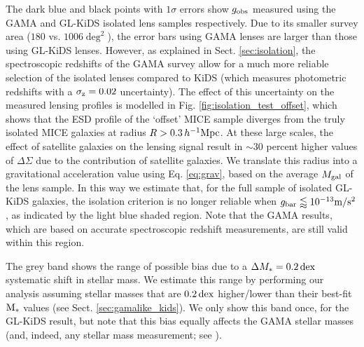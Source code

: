 \documentclass[usenatbib]{mnras}
\newcommand{\hMpc}{\, h^{-1}{\rm{Mpc}} }
\newcommand{\mpss}{ {\rm m/s^2} }
\newcommand{\un}[1]{_{\rm #1}}
\newcommand{\dex}{\, {\rm dex}}
\begin{document}
The dark blue and black points with $1\sigma$ errors show $g\un{obs}$ measured using the GAMA and GL-KiDS isolated lens samples respectively. Due to its smaller survey area ($180$ vs. $1006 \deg^2$), the error bars using GAMA lenses are larger than those using GL-KiDS lenses. However, as explained in Sect. \ref{sec:isolation}, the spectroscopic redshifts of the GAMA survey allow for a much more reliable selection of the isolated lenses compared to KiDS (which measures photometric redshifts with a $\sigma\un{z}=0.02$ uncertainty). The effect of this uncertainty on the measured lensing profiles is modelled in Fig. \ref{fig:isolation_test_offset}, which shows that the ESD profile of the `offset' MICE sample diverges from the truly isolated MICE galaxies at radius $R > 0.3 \hMpc$. At these large scales, the effect of satellite galaxies on the lensing signal result in $\sim30$ percent higher values of $\Delta\Sigma$ due to the contribution of satellite galaxies. We translate this radius into a gravitational acceleration value using Eq. \ref{eq:grav}, based on the average $M\un{gal}$ of the lens sample. In this way we estimate that, for the full sample of isolated GL-KiDS galaxies, the isolation criterion is no longer reliable when $g\un{bar} \lessapprox 10^{-13} \mpss$, as indicated by the light blue shaded region. Note that the GAMA results, which are based on accurate spectroscopic redshift measurements, are still valid within this region.

The grey band shows the range of possible bias due to a $\Delta M_*=0.2 \dex$ systematic shift in stellar mass. We estimate this range by performing our analysis assuming stellar masses that are $0.2 \dex$ higher/lower than their best-fit ${\rm M_*}$ values (see Sect. \ref{sec:gamalike_kids}). We only show this band once, for the GL-KiDS result, but note that this bias equally affects the GAMA stellar masses (and, indeed, any stellar mass measurement; see \citealt{wright2017}).
\end{document}
